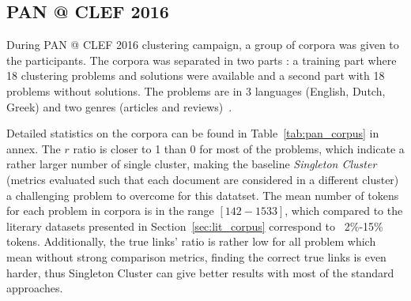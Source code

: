 \subsection{PAN @ CLEF 2016}

During PAN @ CLEF 2016 clustering campaign, a group of corpora was given to the participants.
The corpora was separated in two parts : a training part where 18 clustering problems and solutions were available and a second part with 18 problems without solutions.
The problems are in 3 languages (English, Dutch, Greek) and two genres (articles and reviews)~\cite{pan16}.

Detailed statistics on the corpora can be found in Table~\ref{tab:pan_corpus} in annex.
The $r$ ratio is closer to 1 than 0 for most of the problems, which indicate a rather larger number of single cluster, making the baseline \textit{Singleton Cluster} (metrics evaluated such that each document are considered in a different cluster) a challenging problem to overcome for this datatset.
The mean number of tokens for each problem in corpora is in the range $[142-1533]$, which compared to the literary datasets presented in Section~\ref{sec:lit_corpus} correspond to ~2\%-15\% tokens.
Additionally, the true links' ratio is rather low for all problem which mean without strong comparison metrics, finding the correct true links is even harder, thus Singleton Cluster can give better results with most of the standard approaches.
